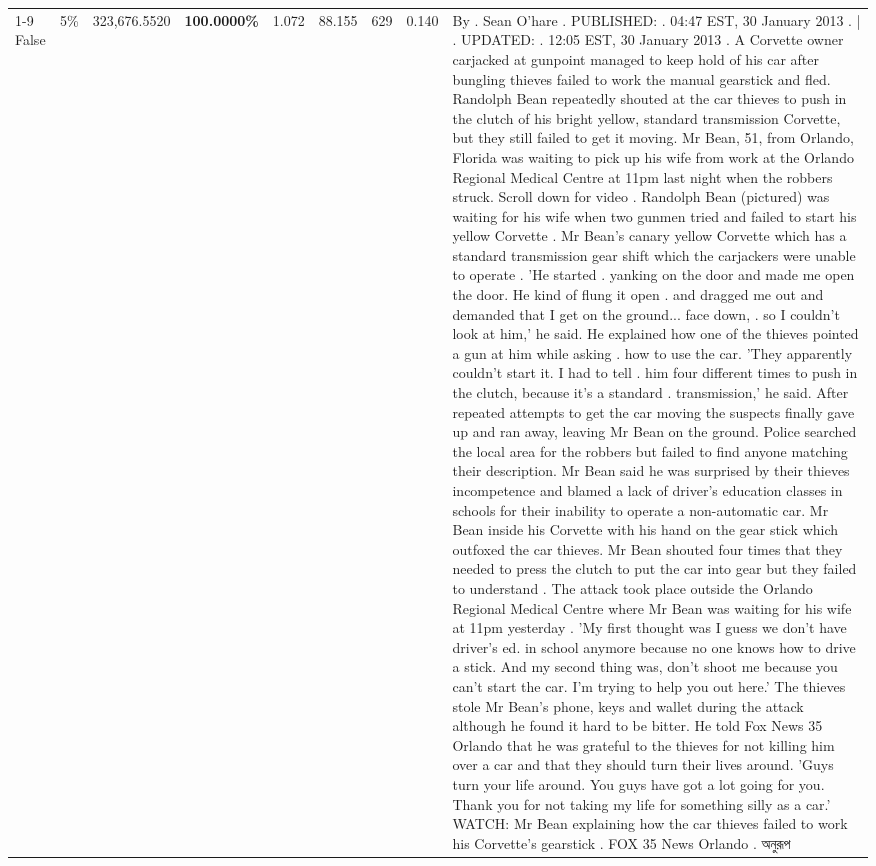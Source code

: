 \begin{table}[H]
\begin{tabular}{lllrlllll}
\cline{1-9} \cline{2-9}
False & 5\% & 323,676.5520 & \bfseries \color{red} 100.0000\% & 1.072 & 88.155 & 629 & 0.140 & By . Sean O'hare . PUBLISHED: . 04:47 EST, 30 January 2013 . | . UPDATED: . 12:05 EST, 30 January 2013 . A Corvette owner carjacked at gunpoint managed to keep hold of his car after bungling thieves failed to work the manual gearstick and fled. Randolph Bean repeatedly shouted at the car thieves to push in the clutch of his bright yellow, standard transmission Corvette, but they still failed to get it moving. Mr Bean, 51, from Orlando, Florida was waiting to pick up his wife from work at the Orlando Regional Medical Centre at 11pm last night when the robbers struck. Scroll down for video . Randolph Bean (pictured) was waiting for his wife when two gunmen tried and failed to start his yellow Corvette . Mr Bean's canary yellow Corvette which has a standard transmission gear shift which the carjackers were unable to operate . 'He started . yanking on the door and made me open the door. He kind of flung it open . and dragged me out and demanded that I get on the ground... face down, . so I couldn't look at him,' he said. He explained how one of the thieves pointed a gun at him while asking . how to use the car. 'They apparently couldn't start it. I had to tell . him four different times to push in the clutch, because it's a standard . transmission,' he said. After repeated attempts to get the car moving the suspects finally gave up and ran away, leaving Mr Bean on the ground. Police searched the local area for the robbers but failed to find anyone matching their description. Mr Bean said he was surprised by their thieves incompetence and blamed a lack of driver's education classes in schools for their inability to operate a non-automatic car. Mr Bean inside his Corvette with his hand on the gear stick which outfoxed the car thieves. Mr Bean shouted four times that they needed to press the clutch to put the car into gear but they failed to understand . The attack took place outside the Orlando Regional Medical Centre where Mr Bean was waiting for his wife at 11pm yesterday . 'My first thought was I guess we don't have driver's ed. in school anymore because no one knows how to drive a stick. And my second thing was, don't shoot me because you can't start the car. I'm trying to help you out here.' The thieves stole Mr Bean's phone, keys and wallet during the attack although he found it hard to be bitter. He told Fox News 35 Orlando that he was grateful to the thieves for not killing him over a car and that they should turn their lives around. 'Guys turn your life around. You guys have got a lot going for you. Thank you for not taking my life for something silly as a car.' WATCH: Mr Bean explaining how the car thieves failed to work his Corvette's gearstick . FOX 35 News Orlando . অনুরূপ \\

\end{tabular}
\end{table}
